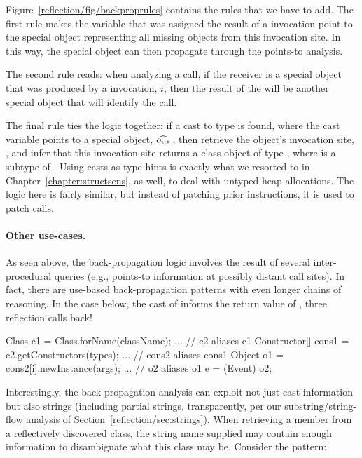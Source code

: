 Figure~\ref{reflection/fig/backproprules} contains the rules that we
have to add. The first rule makes the variable that was assigned the
result of a  invocation point to the special object
representing all missing objects from this invocation site. In this
way, the special object can then propagate through the points-to
analysis.

The second rule reads: when analyzing a  call, if
the receiver is a special object that was produced by a 
invocation, \(i\), then the result of the  will be
another special object
that will identify the  call.

The final rule ties the logic together: if a cast to type  is
found, where the cast variable points to a special object,
\(\widehat{o_{i,\texttt{*}}}\,\), then retrieve the object's 
invocation site, , and infer that this invocation site returns
a class object of type , where  is a subtype of
. Using casts as type hints is exactly what we resorted to in
Chapter~\ref{chapter:structsens}, as well, to deal with untyped heap
allocations. The logic here is fairly similar, but instead of patching
prior  instructions, it is used to patch 
calls.


\paragraph{Other use-cases.}

As seen above, the back-propagation logic involves the result of
several inter-procedural queries (e.g., points-to information at
possibly distant call sites). In fact, there are use-based
back-propagation patterns with even longer chains of reasoning. In the
case below, the cast of  informs the return value of
, three reflection calls back!

\begin{javacodelinum}
Class c1 = Class.forName(className);
...      // c2 aliases c1
Constructor[] cons1 = c2.getConstructors(types); 
...      // cons2 aliases cons1
Object o1 = cons2[i].newInstance(args); 
...      // o2 aliases o1
e = (Event) o2;    
\end{javacodelinum}

Interestingly, the back-propagation analysis can exploit not just cast
information but also strings (including partial strings, transparently,
per our substring/string-flow analysis of Section~\ref{reflection/sec:strings}).
When retrieving a member from a reflectively discovered class, the
string name supplied may contain enough information to disambiguate
what this class may be. Consider the pattern:

